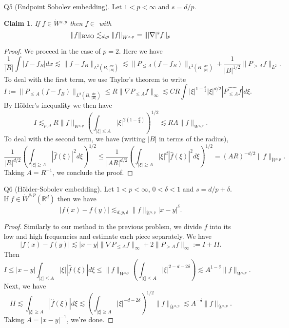 \documentclass[11pt]{article}
\newtheorem*{claim}{Claim}
\theoremstyle{remark}
\newcommand{\1}{\textbf{1}}
\newcommand{\lle}{\lesssim}
\def\norm#1{\| #1  \|}
\newcommand{\BMO}{\textup{BMO}}
\newcommand{\bbR}{\mathbb{R}}
\begin{document}
\begin{enumerate}
\begin{proof}
\[\]
and then we use a change of variable and Taylor expansion in the first variable of $a$ to write
\[
a^w(X,D)f(x) = \int \left[\int \left[a\left(x,\xi \right) + y a_x(x,\xi) \right] e^{2 \pi i(x-y) \cdot \xi} d\xi \right]f(y) dy.
\]
Thus integrating by parts to eliminate the $y$ term, we proceed as in the proof of Lemma 2.1.3. to conclude. The other direction is handled analagously.
\end{proof}
\item[Q5] (Endpoint Sobolev embedding). Let $1 < p < \infty$ and $s = d/p$.
\begin{claim}
If $f \in \dot W{}^{s,p}$ then $f \in$ with
\[
\norm{f}_{\BMO} \lle_{d,p} \norm{f}_{\dot W{}^{s,p}} = \norm{|\nabla|^s f}_{p}
\]
\end{claim}
\begin{proof}
We proceed in the case of $p = 2$. Here we have
\[
\frac{1}{|B|}\int |f - f_B| dx \lle \norm{f - f_B}_{L^2(B,\frac{dx}{|B|})} \lle \norm{P_{\leq A}(f - f_B)}_{L^2(B,\frac{dx}{|B|})} + \frac{1}{|B|^{1/2}} \norm{P_{>A} f}_{L^2}.
\]
To deal with the first term, we use Taylor's theorem to write
\[
I:= \norm{P_{\leq A}(f - f_B)}_{L^2(B,\frac{dx}{|B|})} \leq R \norm{\nabla P_{\leq A} f}_{\infty} \lle C R \int |\xi|^{1-\frac{d}{2}} |\xi|^{d/2} |\widehat{P_{\leq A} f} | d\xi.
\]
By H\"older's inequality we then have
\[
I \lle_{p,d} R \norm{f}_{\dot W{}^{s,p}} \left( \int_{|\xi| \leq A} |\xi|^{2(1-\frac{d}{2}) } \right)^{1/2} \lle R A \norm{f}_{\dot W{}^{s,p}}.
\]
To deal with the second term, we have (writing $|B|$ in terms of the radius),
\[
\frac{1}{|R|^{d/2}} \left(\int_{|\xi| \geq A} |\hat{f}(\xi)|^2 d\xi \right)^{1/2} \leq \frac{1}{|AR|^{d/2}} \left(\int_{|\xi| \geq A} |\xi|^d |\hat{f}(\xi)|^2 d\xi \right)^{1/2} = (AR)^{-d/2} \norm{f}_{\dot W{}^{s,p}}.
\]
Taking $A = R^{-1}$, we conclude the proof.
\end{proof}
\item[Q6] (H\"older-Sobolev embedding). Let $1 < p < \infty$, $0 < \delta < 1$ and $s = d/p + \delta$. If $f \in \dot W^{s,p}(\bbR^d)$ then we have
\[
|f(x) - f(y) | \lle_{d,p,\delta} \norm{f}_{\dot W{}^{s,p}} |x-y|^\delta.
\]
\begin{proof}
Similarly to our method in the previous problem, we divide $f$ into its low and high frequencies and estimate each piece separately. We have
\[
|f(x) - f(y)| \lle |x-y| \norm{\nabla P_{\leq A} f}_\infty + 2 \|P_{>A} f\|_\infty := I + II. 
\]
Then
\[
I \leq |x-y| \int_{|\xi| \leq A} |\xi||\hat{f}(\xi)| d\xi \leq \norm{f}_{\dot W{}^{s,p}} \left(\int_{|\xi| \leq A} |\xi|^{2 - d - 2\delta}\right) \lle A^{1-\delta} \norm{f}_{\dot W{}^{s,p}}.
\]
Next, we have
\[
II \lle \int_{|\xi| \geq A} |\hat{f}(\xi)| d\xi \lle \left(\int_{|\xi| \geq A} 
|\xi|^{-d - 2\delta} \right)^{1/2}\norm{f}_{\dot W{}^{s,p}} \lle A^{-\delta} \norm{f}_{\dot W{}^{s,p}}.
\]
Taking $A = |x-y|^{-1}$, we're done.
\end{proof}
\end{enumerate}
\end{document}
